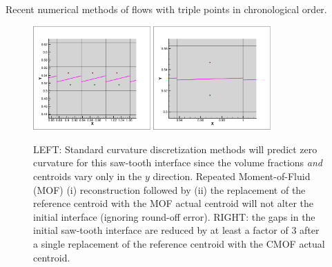 \documentclass[]{article}
\begin{document}
\begin{table}[htbp]
\caption{Recent numerical methods of flows with triple points in 
  chronological order.  \label{tab:triple_point} }
\end{table}

\begin{figure}[htbp]
\centering
\includegraphics[width=0.4\textwidth]{checkerboardMOF.eps}
\includegraphics[width=0.4\textwidth]{checkerboardCMOF.eps}
\caption{LEFT:
 Standard curvature discretization methods 
 \cite{sussman2003second,cummins2005estimating,REMMERSWAAL2022111473}
 will predict zero curvature for this saw-tooth
 interface since the volume fractions {\em and} 
 centroids vary only
 in the $y$ direction.  Repeated Moment-of-Fluid (MOF)
 (i) reconstruction followed by (ii) the replacement of the reference
 centroid with the MOF actual centroid will not alter the initial interface
 (ignoring round-off error).  RIGHT: the gaps in the initial saw-tooth 
 interface are reduced by at least a factor of 3 after a single replacement
 of the reference centroid with the CMOF actual centroid.
 \label{checkerboard} }
\end{figure}
\end{document}

